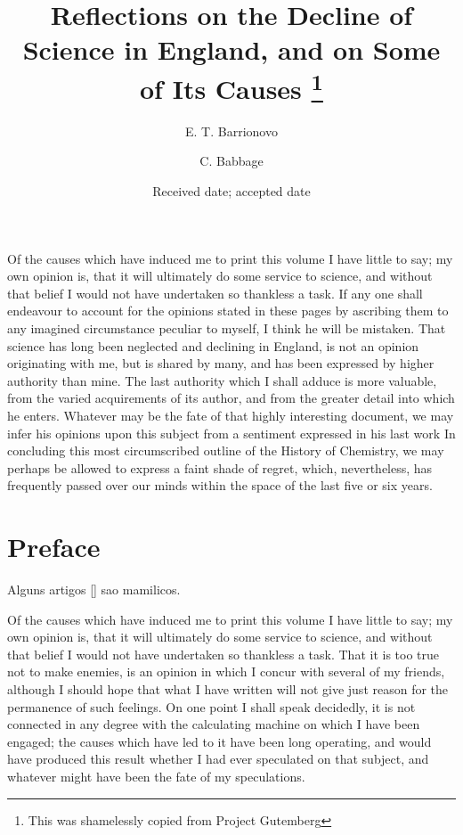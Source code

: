 \documentclass{aa}
\begin{document}
\title{Reflections on the Decline of Science in England, and on Some of Its Causes \thanks{This was shamelessly copied from Project Gutemberg}}

\author{
    E. T. Barrionovo
    \and C. Babbage 
}




\date{Received date; accepted date}

\abstract
{Of the causes which have induced me to print this volume I have little
to say; my own opinion is, that it will ultimately do some service
to science, and without that belief I would not have undertaken so
thankless a task.}
{If any one shall endeavour to account for the opinions stated in these
pages by ascribing them to any imagined circumstance peculiar to myself,
I think he will be mistaken. That science has long been neglected and
declining in England, is not an opinion originating with me, but is
shared by many, and has been expressed by higher authority than mine.}
{The last authority which I shall adduce is more valuable, from the
varied acquirements of its author, and from the greater detail into
which he enters.}
{Whatever may be the fate of that highly interesting document, we may
infer his opinions upon this subject from a sentiment expressed in his
last work}
{In concluding this most circumscribed outline of the History of
Chemistry, we may perhaps be allowed to express a faint shade of regret,
which, nevertheless, has frequently passed over our minds within the
space of the last five or six years.}


\maketitle


\section{Preface}

\label{preface}

Alguns artigos [\cite{cox}] sao mamilicos.

Of the causes which have induced me to print this volume I have little
to say; my own opinion is, that it will ultimately do some service
to science, and without that belief I would not have undertaken so
thankless a task. That it is too true not to make enemies, is an opinion
in which I concur with several of my friends, although I should hope
that what I have written will not give just reason for the permanence of
such feelings. On one point I shall speak decidedly, it is not connected
in any degree with the calculating machine on which I have been engaged;
the causes which have led to it have been long operating, and would have
produced this result whether I had ever speculated on that subject, and
whatever might have been the fate of my speculations.
\end{document}
